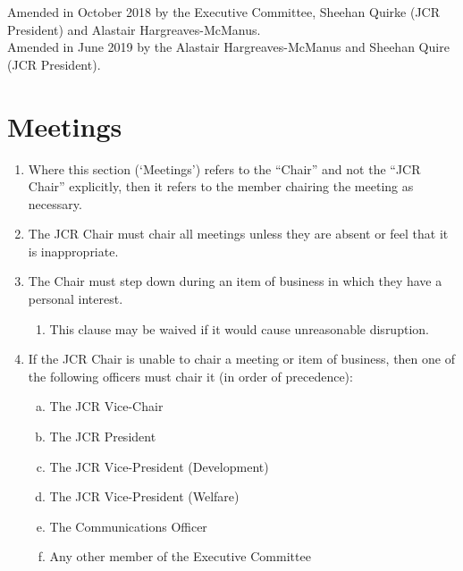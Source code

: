 \documentclass[12pt]{article}  %
\begin{document}
Amended in October 2018 by the Executive Committee, Sheehan Quirke (JCR President) and Alastair Hargreaves-McManus.\\
Amended in June 2019 by the Alastair Hargreaves-McManus and Sheehan Quire (JCR President).
\newpage
\tableofcontents{}
\newpage


\section{Meetings}
\begin{enumerate}
    \subsection{The Chair}
    \item Where this section (‘Meetings’) refers to the “Chair” and not the “JCR Chair” explicitly, then it refers to the member chairing the meeting as necessary.
    \item The JCR Chair must chair all meetings unless they are absent or feel that it is inappropriate.
    \item The Chair must step down during an item of business in which they have a personal interest.
    \begin{enumerate}
        \item This clause may be waived if it would cause unreasonable disruption.
    \end{enumerate}
    \item If the JCR Chair is unable to chair a meeting or item of business, then one of the following officers must chair it (in order of precedence):
    \begin{enumerate}[(a)]
        \item The JCR Vice-Chair
        \item The JCR President
        \item The JCR Vice-President (Development)
        \item The JCR Vice-President (Welfare)
        \item The Communications Officer
        \item Any other member of the Executive Committee
    \end{enumerate}

\end{enumerate}
\end{document}
